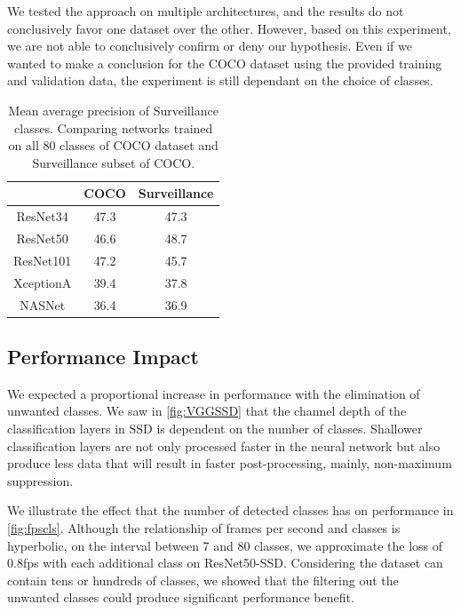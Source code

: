 We tested the approach on multiple architectures, and the results do not conclusively favor one dataset over the other. However, based on this experiment, we are not able to conclusively confirm or deny our hypothesis. Even if we wanted to make a conclusion for the COCO dataset using the provided training and validation data, the experiment is still dependant on the choice of classes.

\begin{table}
    \centering
    \begin{tabular}{c|c|c}
         & COCO & Surveillance  \\
         \hline
        ResNet34 & 47.3 & 47.3 \\
        ResNet50 & 46.6 & 48.7 \\
        ResNet101 & 47.2 & 45.7 \\
        XceptionA & 39.4 & 37.8 \\
        NASNet & 36.4 & 36.9 
    \end{tabular}
    \caption[SSD's precision comparison between COCO and Surveillance datasets]{Mean average precision of Surveillance classes. Comparing networks trained on all 80 classes of COCO dataset and Surveillance subset of COCO.}
    \label{tab:ssdcocosurv}
\end{table}

\subsection{Performance Impact}
We expected a proportional increase in performance with the elimination of unwanted classes. We saw in \cref{fig:VGGSSD} that the channel depth of the classification layers in SSD is dependent on the number of classes. Shallower classification layers are not only processed faster in the neural network but also produce less data that will result in faster post-processing, mainly, non-maximum suppression.

We illustrate the effect that the number of detected classes has on performance in \cref{fig:fpscls}. Although the relationship of frames per second and classes is hyperbolic, on the interval between 7 and 80 classes, we approximate the loss of 0.8fps with each additional class on ResNet50-SSD. Considering the dataset can contain tens or hundreds of classes, we showed that the filtering out the unwanted classes could produce significant performance benefit.

